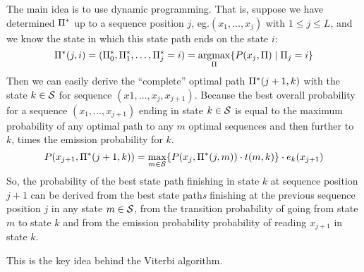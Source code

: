 The main idea is to use dynamic programming.  That is, suppose we have
determined \(\Pi^*\) up to a sequence position \(j\), eg.\@ \((x_1,\dotsc,x_j)\)
with \(1\leq j\leq L\), and we know the state in which this state path ends on
the state \(i\):
\[
    \Pi^*(j,i) = (\Pi_0^*, \Pi_1^*, \dotsc, \Pi_j^* = i)
                 = \operatorname*{argmax}_{\Pi} \{ P(x_j,\Pi) \mid \Pi_j = i \}
\]
Then we can easily derive the \enquote{complete} optimal path \(\Pi^*(j+1,k)\)
with the state \(k\in\mathcal{S}\) for sequence \((x1,\dotsc,x_j,x_{j+1})\).
Because the best overall probability for a sequence \((x_1,\dotsc,x_{j+1})\)
ending in state \(k\in\mathcal{S}\) is equal to the maximum probability of any
optimal path to any \(m\) optimal sequences and then further to \(k\), times the
emission probability for \(k\).
\[
    P(x_{j+1}, \Pi^*(j+1,k))
  = \max_{m\in\mathcal{S}} \{ P(x_j,\Pi^*(j,m)) \cdot t(m,k) \} \cdot e_k(x_{j+1})
\]
So, the probability of the best state path finishing in state \(k\) at sequence
position \(j+1\) can be derived from the best state path\emph{s} finishing at
the previous sequence position \(j\) in any state \(m\in\mathcal{S}\), from the
transition probability of going from state \(m\) to state \(k\) and from the
emission probability probability of reading \(x_{j+1}\) in state \(k\).

This is the key idea behind the Viterbi algorithm.


